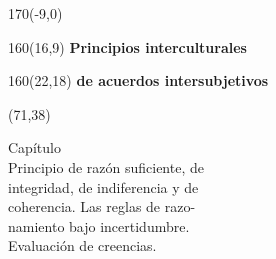 \documentclass[shownotes,aspectratio=169]{beamer}
\newcounter{capitulo}
\newcommand{\unidad}{\thecapitulo \stepcounter{capitulo}}
\begin{document}
\begin{frame}
\begin{textblock}{170}(-9,0)
\end{textblock}

\begin{textblock}{160}(16,9)
\LARGE \textcolor{black!5}{\fontsize{22}{0}\selectfont \textbf{Principios interculturales}}
\end{textblock}
\begin{textblock}{160}(22,18)
\LARGE \textcolor{black!5}{\fontsize{22}{0}\selectfont \textbf{de acuerdos intersubjetivos}}
\end{textblock}


\begin{textblock}{55}(71,38)
\begin{turn}{33}
\parbox{6cm}{
\textcolor{black!5}{\hspace{-0.3cm}Capítulo \unidad} \\
\small\textcolor{black!5}{\hspace{-0.1cm}Principio de razón suficiente, de}\\
\small\textcolor{black!5}{integridad, de indiferencia y de} \\
\small\textcolor{black!5}{\hspace{0.1cm}coherencia. Las reglas de razo-} \\ \small\textcolor{black!5}{\hspace{0.2cm}namiento bajo incertidumbre.} \\
\small\textcolor{black!5}{\hspace{0.36cm}Evaluación de creencias.} \\
}
\end{turn}
\end{textblock}

\end{frame}
\end{document}

